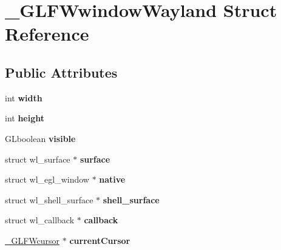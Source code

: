 \hypertarget{struct__GLFWwindowWayland}{}\section{\+\_\+\+G\+L\+F\+Wwindow\+Wayland Struct Reference}
\label{struct__GLFWwindowWayland}
\subsection*{Public Attributes}
\begin{DoxyCompactItemize}
\item 
\hypertarget{struct__GLFWwindowWayland_ae7a74e82083246545e7caf62bb839cf3}{}int {\bfseries width}\label{struct__GLFWwindowWayland_ae7a74e82083246545e7caf62bb839cf3}

\item 
\hypertarget{struct__GLFWwindowWayland_a4db9e7087b799ac1d45ba74214347e9d}{}int {\bfseries height}\label{struct__GLFWwindowWayland_a4db9e7087b799ac1d45ba74214347e9d}

\item 
\hypertarget{struct__GLFWwindowWayland_af067042fceec834a0cee04dbd1479328}{}G\+Lboolean {\bfseries visible}\label{struct__GLFWwindowWayland_af067042fceec834a0cee04dbd1479328}

\item 
\hypertarget{struct__GLFWwindowWayland_a1245cc6dddb436bed05453cfaab7093a}{}struct wl\+\_\+surface $\ast$ {\bfseries surface}\label{struct__GLFWwindowWayland_a1245cc6dddb436bed05453cfaab7093a}

\item 
\hypertarget{struct__GLFWwindowWayland_a8d6277d6ea667fcef929dea4624510a8}{}struct wl\+\_\+egl\+\_\+window $\ast$ {\bfseries native}\label{struct__GLFWwindowWayland_a8d6277d6ea667fcef929dea4624510a8}

\item 
\hypertarget{struct__GLFWwindowWayland_a3af8b8c90487c43d361834cb1d152900}{}struct wl\+\_\+shell\+\_\+surface $\ast$ {\bfseries shell\+\_\+surface}\label{struct__GLFWwindowWayland_a3af8b8c90487c43d361834cb1d152900}

\item 
\hypertarget{struct__GLFWwindowWayland_a89673e8d23f9b390e9294685605c3cf0}{}struct wl\+\_\+callback $\ast$ {\bfseries callback}\label{struct__GLFWwindowWayland_a89673e8d23f9b390e9294685605c3cf0}

\item 
\hypertarget{struct__GLFWwindowWayland_a872dbd1fe8731988ae5be6c94e3293d4}{}\hyperlink{struct__GLFWcursor}{\+\_\+\+G\+L\+F\+Wcursor} $\ast$ {\bfseries current\+Cursor}\label{struct__GLFWwindowWayland_a872dbd1fe8731988ae5be6c94e3293d4}


\end{DoxyCompactItemize}
